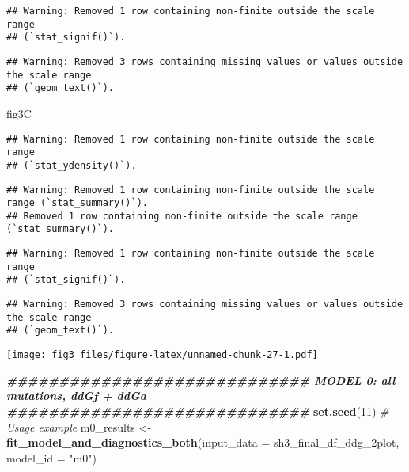 \documentclass[
]{article}
\newenvironment{Shaded}{\begin{snugshade}}{\end{snugshade}}
\newcommand{\AttributeTok}[1]{\textcolor[rgb]{0.13,0.29,0.53}{#1}}
\newcommand{\CommentTok}[1]{\textcolor[rgb]{0.56,0.35,0.01}{\textit{#1}}}
\newcommand{\DecValTok}[1]{\textcolor[rgb]{0.00,0.00,0.81}{#1}}
\newcommand{\DocumentationTok}[1]{\textcolor[rgb]{0.56,0.35,0.01}{\textbf{\textit{#1}}}}
\newcommand{\FunctionTok}[1]{\textcolor[rgb]{0.13,0.29,0.53}{\textbf{#1}}}
\newcommand{\NormalTok}[1]{#1}
\newcommand{\OtherTok}[1]{\textcolor[rgb]{0.56,0.35,0.01}{#1}}
\newcommand{\StringTok}[1]{\textcolor[rgb]{0.31,0.60,0.02}{#1}}
\begin{document}
\begin{verbatim}
## Warning: Removed 1 row containing non-finite outside the scale range
## (`stat_signif()`).
\end{verbatim}

\begin{verbatim}
## Warning: Removed 3 rows containing missing values or values outside the scale range
## (`geom_text()`).
\end{verbatim}

\begin{Shaded}
\begin{Highlighting}[]
\NormalTok{fig3C}
\end{Highlighting}
\end{Shaded}

\begin{verbatim}
## Warning: Removed 1 row containing non-finite outside the scale range
## (`stat_ydensity()`).
\end{verbatim}

\begin{verbatim}
## Warning: Removed 1 row containing non-finite outside the scale range (`stat_summary()`).
## Removed 1 row containing non-finite outside the scale range (`stat_summary()`).
\end{verbatim}

\begin{verbatim}
## Warning: Removed 1 row containing non-finite outside the scale range
## (`stat_signif()`).
\end{verbatim}

\begin{verbatim}
## Warning: Removed 3 rows containing missing values or values outside the scale range
## (`geom_text()`).
\end{verbatim}

\texttt{[image: fig3\_files/figure-latex/unnamed-chunk-27-1.pdf]}

\begin{Shaded}
\begin{Highlighting}[]
\DocumentationTok{\#\#\#\#\#\#\#\#\#\#\#\#\#\#\#\#\#\#\#\#\#\#\#\#\#\#\#\#\# MODEL 0: all mutations, ddGf + ddGa \#\#\#\#\#\#\#\#\#\#\#\#\#\#\#\#\#\#\#\#\#\#\#\#\#\#\#\#\#}
\FunctionTok{set.seed}\NormalTok{(}\DecValTok{11}\NormalTok{)}
\CommentTok{\# Usage example}
\NormalTok{m0\_results }\OtherTok{\textless{}{-}} \FunctionTok{fit\_model\_and\_diagnostics\_both}\NormalTok{(}\AttributeTok{input\_data =}\NormalTok{ sh3\_final\_df\_ddg\_2plot, }\AttributeTok{model\_id =} \StringTok{"m0"}\NormalTok{)}
\end{Highlighting}
\end{Shaded}
\end{document}
